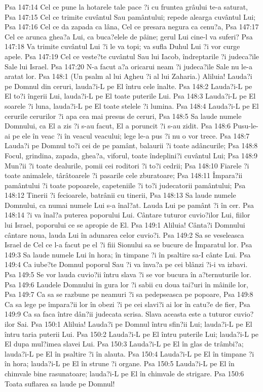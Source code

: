 Psa 147:14  Cel ce pune la hotarele tale pace ?i cu fruntea grâului te-a saturat,
Psa 147:15  Cel ce trimite cuvântul Sau pamântului; repede alearga cuvântul Lui;
Psa 147:16  Cel ce da zapada ca lâna, Cel ce presara negura ca cenu?a,
Psa 147:17  Cel ce arunca ghea?a Lui, ca buca?elele de pâine; gerul Lui cine-l va suferi?
Psa 147:18  Va trimite cuvântul Lui ?i le va topi; va sufla Duhul Lui ?i vor curge apele.
Psa 147:19  Cel ce veste?te cuvântul Sau lui Iacob, îndreptarile ?i judeca?ile Sale lui Israel.
Psa 147:20  N-a facut a?a oricarui neam ?i judeca?ile Sale nu le-a aratat lor.
Psa 148:1  (Un psalm al lui Agheu ?i al lui Zaharia.) Aliluia! Lauda?i pe Domnul din ceruri, lauda?i-L pe El întru cele înalte.
Psa 148:2  Lauda?i-L pe El to?i îngerii Lui, lauda?i-L pe El toate puterile Lui.
Psa 148:3  Lauda?i-L pe El soarele ?i luna, lauda?i-L pe El toate stelele ?i lumina.
Psa 148:4  Lauda?i-L pe El cerurile cerurilor ?i apa cea mai presus de ceruri,
Psa 148:5  Sa laude numele Domnului, ca El a zis ?i s-au facut, El a poruncit ?i s-au zidit.
Psa 148:6  Pusu-le-ai pe ele în veac ?i în veacul veacului; lege le-a pus ?i nu o vor trece.
Psa 148:7  Lauda?i pe Domnul to?i cei de pe pamânt, balaurii ?i toate adâncurile;
Psa 148:8  Focul, grindina, zapada, ghea?a, viforul, toate îndeplini?i cuvântul Lui;
Psa 148:9  Mun?ii ?i toate dealurile, pomii cei roditori ?i to?i cedrii;
Psa 148:10  Fiarele ?i toate animalele, târâtoarele ?i pasarile cele zburatoare;
Psa 148:11  Împara?ii pamântului ?i toate popoarele, capeteniile ?i to?i judecatorii pamântului;
Psa 148:12  Tinerii ?i fecioarele, batrânii cu tinerii,
Psa 148:13  Sa laude numele Domnului, ca numai numele Lui s-a înal?at. Lauda Lui pe pamânt ?i în cer.
Psa 148:14  ?i va înal?a puterea poporului Lui. Cântare tuturor cuvio?ilor Lui, fiilor lui Israel, poporului ce se apropie de El.
Psa 149:1  Aliluia! Cânta?i Domnului cântare noua, lauda Lui în adunarea celor cuvio?i.
Psa 149:2  Sa se veseleasca Israel de Cel ce l-a facut pe el ?i fiii Sionului sa se bucure de Împaratul lor.
Psa 149:3  Sa laude numele Lui în hora; în timpane ?i în psaltire sa-I cânte Lui.
Psa 149:4  Ca iube?te Domnul poporul Sau ?i va înva?a pe cei blânzi ?i-i va izbavi.
Psa 149:5  Se vor lauda cuvio?ii întru slava ?i se vor bucura în a?ternuturile lor.
Psa 149:6  Laudele Domnului în gura lor ?i sabii cu doua tai?uri în mâinile lor,
Psa 149:7  Ca sa se razbune pe neamuri ?i sa pedepseasca pe popoare,
Psa 149:8  Ca sa lege pe împara?ii lor în obezi ?i pe cei slavi?i ai lor în catu?e de fier,
Psa 149:9  Ca sa faca între dân?ii judecata scrisa. Slava aceasta este a tuturor cuvio?ilor Sai.
Psa 150:1  Aliluia! Lauda?i pe Domnul întru sfin?ii Lui; lauda?i-L pe El întru taria puterii Lui.
Psa 150:2  Lauda?i-L pe El întru puterile Lui; lauda?i-L pe El dupa mul?imea slavei Lui.
Psa 150:3  Lauda?i-L pe El în glas de trâmbi?a; lauda?i-L pe El în psaltire ?i în alauta.
Psa 150:4  Lauda?i-L pe El în timpane ?i în hora; lauda?i-L pe El în strune ?i organe.
Psa 150:5  Lauda?i-L pe El în chimvale bine rasunatoare; lauda?i-L pe El în chimvale de strigare.
Psa 150:6  Toata suflarea sa laude pe Domnul!


